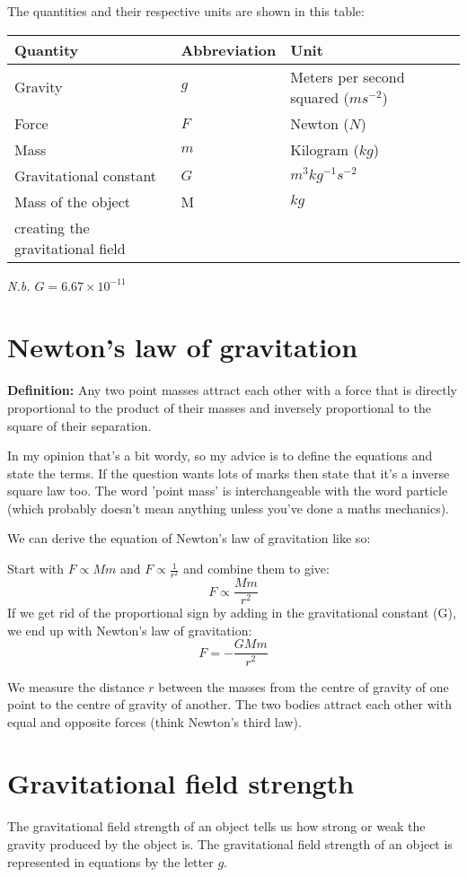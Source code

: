\documentclass{article}
\begin{document}
The quantities and their respective units are shown in this table:

\begin{center}
	\begin{tabular}{|l|l|l|}
		\hline
			Quantity & Abbreviation & Unit \\ \hline
			Gravity & $g$ & Meters per second squared ($ms^{-2}$) \\ \hline
			Force & $F$ & Newton ($N$) \\ \hline
			Mass & $m$ & Kilogram ($kg$) \\ \hline
			Gravitational constant & $G$ & $m^3kg^{-1}s^{-2}$ \\ \hline
			Mass of the object & M & $kg$ \\
			creating the gravitational field & & \\ \hline
	\end{tabular}
\end{center}
\textit{N.b. $G = 6.67 \times 10^{-11}$}



\section*{Newton's law of gravitation}
\textbf{Definition:} Any two point masses attract each other with a force that
is directly proportional to the product of their masses and inversely
proportional to the square of their separation.

In my opinion that's a bit wordy, so my advice is to define the equations and
state the terms. If the question wants lots of marks then state that it's a
inverse square law too. The word 'point mass' is interchangeable with the word
particle (which probably doesn't mean anything unless you've done a maths
mechanics).

We can derive the equation of Newton's law of gravitation like so:

Start with $F \propto Mm$ and $F \propto \frac{1}{r^2}$ and combine them to
give:
\[
	F \propto \frac{Mm}{r^2}
\]
If we get rid of the proportional sign by adding in the gravitational constant
(G), we end up with Newton's law of gravitation:
\[
	F = -\frac{GMm}{r^2}
\]

We measure the distance $r$ between the masses from the centre of gravity of one
point to the centre of gravity of another. The two bodies attract each other
with equal and opposite forces (think Newton's third law).

\section*{Gravitational field strength}
The gravitational field strength of an object tells us how strong or weak the
gravity produced by the object is. The gravitational field strength of an object
is represented in equations by the letter $g$.
\end{document}
